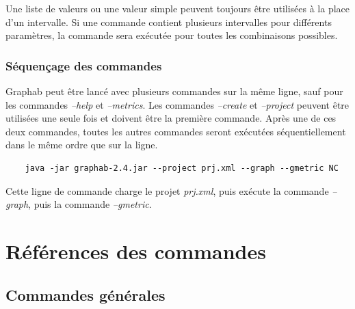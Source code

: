 \documentclass[a4paper,10pt]{report}
\begin{document}
Une liste de valeurs ou une valeur simple peuvent toujours être utilisées à la place d'un intervalle.
Si une commande contient plusieurs intervalles pour différents paramètres, la commande sera exécutée pour toutes les combinaisons possibles.

\subsection{Séquençage des commandes}
Graphab peut être lancé avec plusieurs commandes sur la même ligne, sauf pour les commandes \textit{--help} et \textit{--metrics}.
Les commandes \textit{--create} et \textit{--project} peuvent être utilisées une seule fois et doivent être la première commande.
Après une de ces deux commandes, toutes les autres commandes seront exécutées séquentiellement dans le même ordre que sur la ligne.

\begin{Verbatim}
	java -jar graphab-2.4.jar --project prj.xml --graph --gmetric NC  
\end{Verbatim}
Cette ligne de commande charge le projet \textit{prj.xml}, puis exécute la commande \textit{--graph}, puis la commande \textit{--gmetric}.


\chapter{Références des commandes}
\section{Commandes générales}
\end{document}
